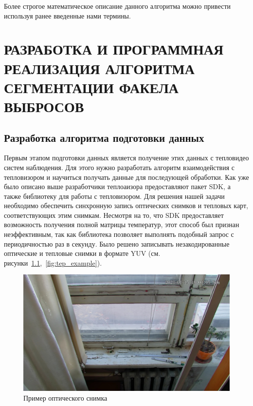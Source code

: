 \documentclass[14pt, a4paper]{extreport}
\begin{document}
	Более строгое математическое описание данного алгоритма можно привести используя ранее введенные нами термины.
	

\chapter[\vspace*{-0.22cm}РАЗРАБОТКА И ПРОГРАММНАЯ РЕАЛИЗАЦИЯ АЛГОРИТМА \hspace*{-0.5cm} СЕГМЕНТАЦИИ ФАКЕЛА ВЫБРОСОВ]{\vspace*{-0.22cm}РАЗРАБОТКА И ПРОГРАММНАЯ РЕАЛИЗАЦИЯ АЛГОРИТМА СЕГМЕНТАЦИИ ФАКЕЛА ВЫБРОСОВ}
\section[Разработка алгоритма подготовки данных]{Разработка алгоритма подготовки данных}

	Первым этапом подготовки данных является получение этих данных с тепловидео систем наблюдения. Для этого нужно разработать алгоритм взаимодействия с тепловизором и научиться получать данные для последующей обработки. Как уже было описано выше разработчики теплоаизора предоставляют пакет SDK, а также библиотеку для работы с тепловизором.
	Для решения нашей задачи необходимо обеспечить синхронную запись оптических снимков и тепловых карт, соответствующих этим снимкам. Несмотря на то, что SDK предоставляет возможность получения полной матрицы температур, этот способ был признан неэффективным, так как библиотека позволяет выполнять подобный запрос с периодичностью раз в секунду. Было решено записывать незакодированные оптические и тепловые снимки в формате YUV (см. рисунки~\ref{fig:opt_example},~\ref{fig:tep_example}). 
	\begin{figure}[h!]
		\centering
		\includegraphics[width = 13cm]{image/chapter_2/opt_example}	
		\caption{Пример оптического снимка}
		\label{fig:opt_example}
	\end{figure}
	
\end{document}
